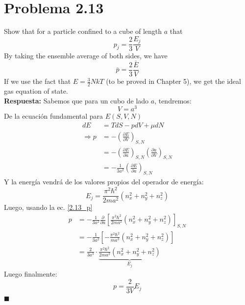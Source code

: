 \documentclass[]{article}
\numberwithin{equation}{section}
\newcommand{\0}{\textcolor{gray}{0}}
\newcommand{\deriv}[3]{\left(\frac{\partial #1}{\partial #2} \right)_{#3}}
\newcommand{\qed}{\hfill\(\blacksquare\)}
\begin{document}
\section{Problema 2.13}
Show that for a particle confined to a cube of length $a$ that
\begin{equation*}
	p_j=\frac{2}{3} \frac{E_j}{V}
\end{equation*}
By taking the ensemble average of both sides, we have
\begin{equation*}	
	\bar{p}=\frac{2}{3} \frac{\bar{E}}{V}
\end{equation*}
If we use the fact that $E=\frac{3}{2} N k T$ (to be proved in Chapter 5), we get the ideal gas equation of state.
\\

\textbf{Respuesta:}
Sabemos que para un cubo de lado \(a\), tendremos:
\begin{equation}
	V = a^3 \label{2.13_V}
\end{equation}
De la ecuación fundamental para \(E(S,V,N)\)
\begin{align}
	dE &= T dS - p dV + \mu dN\label{fundamental_E_SVN}\\
	\Rightarrow p &= -\deriv{E}{V}{S,N}\label{p_EVSN}\\
	&= - \deriv{E}{a}{S,N}\deriv{a}{V}{S,N}\nonumber\\
	&= - \frac{1}{3 a^{2}}\deriv{E}{a}{S,N}\label{2.13_p}
\end{align}
Y la energía vendrá de los valores propios del operador de energía:
\begin{equation}
	E_j = \frac{\pi^2 \hbar^2}{2 m a^2}\left( n_x^2 + n_y^2 + n_z^2\right)\label{2.13_E}
\end{equation}
Luego, usando la ec. \ref{2.13_p}
\begin{align*}
	p &= - \frac{1}{3 a^{2}}\frac{\partial}{\partial a}\left[\frac{\pi^2 \hbar^2}{2 m a^2}\left( n_x^2 + n_y^2 + n_z^2\right) \right]_{S,N}\\
	&= - \frac{1}{3 a^{2}}\left[- \frac{\pi^2 \hbar^2}{m a^3}\left( n_x^2 + n_y^2 + n_z^2\right)  \right]\\
	&= \frac{2}{3 a^3}\cdot\underbrace{\frac{\pi^2 \hbar^2}{2 m a^2}\left( n_x^2 + n_y^2 + n_z^2\right)}_{E_j}
\end{align*}
Luego finalmente:
\begin{equation}
	p = \frac{2}{3 V} E_j
\end{equation}
\qed
\end{document}
